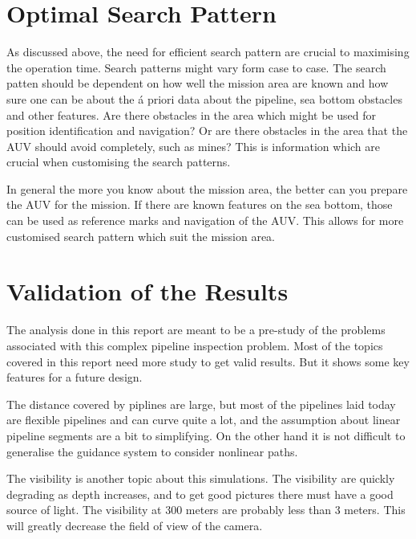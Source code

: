 \section{Optimal Search Pattern}
	As discussed above, the need for efficient search pattern are crucial to maximising the operation
	time. Search patterns might vary form case to case. The search patten should be dependent on how well
	the mission area are known and how sure one can be about the \'a priori data about the pipeline, sea
	bottom obstacles and other features. Are there obstacles in the area which might be used for
	position identification and navigation? Or are there obstacles in the area that the AUV should avoid
	completely, such as mines? This is information which are crucial when customising the search patterns.

	In general the more you know about the mission area, the better can you prepare the AUV for the
	mission. If there are known features on the sea bottom, those can be used as reference marks and
	navigation of the AUV. This allows for more customised search pattern which suit the mission area. 

\section{Validation of the Results}
	The analysis done in this report are meant to be a pre-study of the problems associated with this
	complex pipeline inspection problem. Most of the topics covered in this report need more study to get
	valid results. But it shows some key features for a future design.

	The distance covered by piplines are large, but most of the pipelines laid today are flexible
	pipelines and can curve quite a lot, and the assumption about linear pipeline segments are a bit to
	simplifying. On the other hand it is not difficult to generalise the guidance system to consider
	nonlinear paths. 

	The visibility is another topic about this simulations. The visibility are quickly degrading as depth
	increases, and to get good pictures there must have a good source of light. The visibility at 300
	meters are probably less than 3 meters. This will greatly decrease the field of view of the camera.

	
